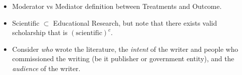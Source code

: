 \documentclass{TC}
\begin{document}
\begin{itemize}[(??)]
	\item Moderator vs Mediator definition between Treatments and Outcome.
\end{itemize}
\begin{itemize}[(!!)]
	\item Scientific $\subset$ Educational Research, but note that there exists valid scholarship that is $(\text{scientific})^c$.
	\item Consider \emph{who} wrote the literature, the \emph{intent} of the writer and people who commissioned the writing (be it publisher or government entity), and the \emph{audience} of the writer. 

\end{itemize}
\end{document}
